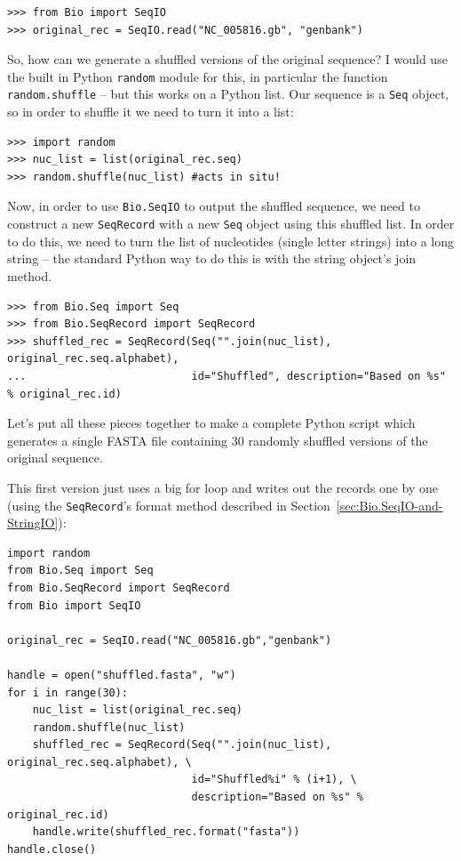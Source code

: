 \documentclass{report}
\begin{document}
\begin{verbatim}
>>> from Bio import SeqIO
>>> original_rec = SeqIO.read("NC_005816.gb", "genbank")
\end{verbatim}

So, how can we generate a shuffled versions of the original sequence?  I would
use the built in Python \verb|random| module for this, in particular the function
\verb|random.shuffle| -- but this works on a Python list.  Our sequence is a
\verb|Seq| object, so in order to shuffle it we need to turn it into a list:

\begin{verbatim}
>>> import random
>>> nuc_list = list(original_rec.seq)
>>> random.shuffle(nuc_list) #acts in situ!
\end{verbatim}

Now, in order to use \verb|Bio.SeqIO| to output the shuffled sequence, we need
to construct a new \verb|SeqRecord| with a new \verb|Seq| object using this
shuffled list.  In order to do this, we need to turn the list of nucleotides
(single letter strings) into a long string -- the standard Python way to do
this is with the string object's join method.

\begin{verbatim}
>>> from Bio.Seq import Seq
>>> from Bio.SeqRecord import SeqRecord
>>> shuffled_rec = SeqRecord(Seq("".join(nuc_list), original_rec.seq.alphabet),
...                          id="Shuffled", description="Based on %s" % original_rec.id)
\end{verbatim}

Let's put all these pieces together to make a complete Python script which
generates a single FASTA file containing 30 randomly shuffled versions of
the original sequence.

This first version just uses a big for loop and writes out the records one by one
(using the \verb|SeqRecord|'s format method described in
Section~\ref{sec:Bio.SeqIO-and-StringIO}):

\begin{verbatim}
import random
from Bio.Seq import Seq
from Bio.SeqRecord import SeqRecord
from Bio import SeqIO

original_rec = SeqIO.read("NC_005816.gb","genbank")

handle = open("shuffled.fasta", "w")
for i in range(30):
    nuc_list = list(original_rec.seq)
    random.shuffle(nuc_list)
    shuffled_rec = SeqRecord(Seq("".join(nuc_list), original_rec.seq.alphabet), \
                             id="Shuffled%i" % (i+1), \
                             description="Based on %s" % original_rec.id)
    handle.write(shuffled_rec.format("fasta"))
handle.close()
\end{verbatim}
\end{document}
